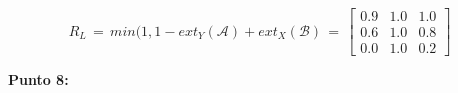 \documentclass[10pt,onecolumn,twoside,letterpaper]{article}
\newcommand{\myreferences}{../../../doc/review/review/library}
\begin{document}
\begin{equation*}
  R_L \,=\,min(1,1-ext_Y(\mathcal{A})+ext_X(\mathcal{B})\,=\,
\left[
  \begin{array}{ccc}
    0.9&1.0&1.0\\
    0.6&1.0&0.8\\
    0.0&1.0&0.2  
  \end{array}
\right]
\end{equation*}
\par{\bf \large Punto 8:}\\



\end{document}

